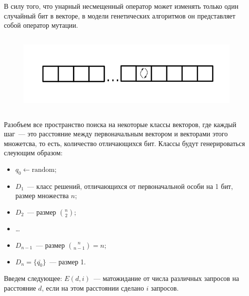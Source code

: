 \label{unary}

В силу того, что унарный несмещенный оператор может изменять только один случайный бит в векторе, в модели генетических алгоритмов он представляет собой оператор мутации. 

\begin{figure}[H]
\centering
\includegraphics[height=4cm]{pic/un.png}
\end{figure}

Разобъем все пространство поиска на некоторые классы векторов, где каждый шаг~--- это расстояние между первоначальным вектором и векторами этого множетсва, то есть, количество отличающихся бит. Классы 
будут генерироваться слеующим образом: 
\begin{itemize}
   \item $q_0 \leftarrow \textrm{random}$;
   \item $D_1$~--- класс решений, отличающихся от первоначальной особи на 1 бит, размер множества $n$;
   \item $D_2$~--- размер $\binom{n}{2}$;
   \item \ldots
   \item $D_{n-1}$~--- размер $\binom{n}{n - 1} = n$;
   \item $D_n = \{\bar{q_0}\}$~--- размер 1.
\end{itemize} 

Введем следующее: $E(d, i)$~--- матожидание от числа различных запросов на расстояние $d$, если на этом расстоянии сделано $i$ запросов.

